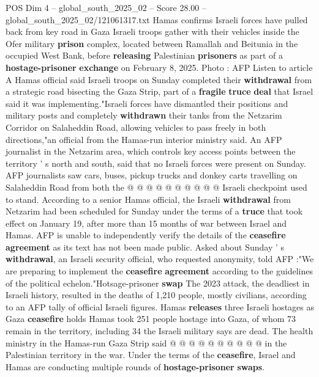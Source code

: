 \begin{textsample}{POS Dim 4 – global\_south\_2025\_02 – Score 28.00 – global\_south\_2025\_02/121061317.txt}  \label{ex:f4_pos_029}
Hamas confirms Israeli forces have pulled back from key road in Gaza Israeli troops gather with their vehicles inside the Ofer military \textbf{prison} complex, located between Ramallah and Beitunia in the occupied West Bank, before \textbf{releasing} Palestinian \textbf{prisoners} as part of a \textbf{hostage-prisoner} \textbf{exchange} on February 8, 2025.
Photo : AFP Listen to article A Hamas official said Israeli troops on Sunday completed their \textbf{withdrawal} from a strategic road bisecting the Gaza Strip, part of a \textbf{fragile} \textbf{truce} \textbf{deal} that Israel said it was implementing."Israeli forces have dismantled their positions and military posts and completely \textbf{withdrawn} their tanks from the Netzarim Corridor on Salaheddin Road, allowing vehicles to pass freely in both directions,"an official from the Hamas-run interior ministry said.
An AFP journalist in the Netzarim area, which controls key access points between the territory ' s north and south, said that no Israeli forces were present on Sunday.
AFP journalists saw cars, buses, pickup trucks and donkey carts travelling on Salaheddin Road from both the @ @ @ @ @ @ @ @ @ @ Israeli checkpoint used to stand.
According to a senior Hamas official, the Israeli \textbf{withdrawal} from Netzarim had been scheduled for Sunday under the terms of a \textbf{truce} that took effect on January 19, after more than 15 months of war between Israel and Hamas.
AFP is unable to independently verify the details of the \textbf{ceasefire} \textbf{agreement} as its text has not been made public.
Asked about Sunday ' s \textbf{withdrawal}, an Israeli security official, who requested anonymity, told AFP :"We are preparing to implement the \textbf{ceasefire} \textbf{agreement} according to the guidelines of the political echelon."Hotsage-prisoner \textbf{swap} The 2023 attack, the deadliest in Israeli history, resulted in the deaths of 1,210 people, mostly civilians, according to an AFP tally of official Israeli figures.
Hamas \textbf{releases} three Israeli hostages as Gaza \textbf{ceasefire} holds Hamas took 251 people hostage into Gaza, of whom 73 remain in the territory, including 34 the Israeli military says are dead.
The health ministry in the Hamas-run Gaza Strip said @ @ @ @ @ @ @ @ @ @ in the Palestinian territory in the war.
Under the terms of the \textbf{ceasefire}, Israel and Hamas are conducting multiple rounds of \textbf{hostage-prisoner} \textbf{swaps}.

\end{textsample}
